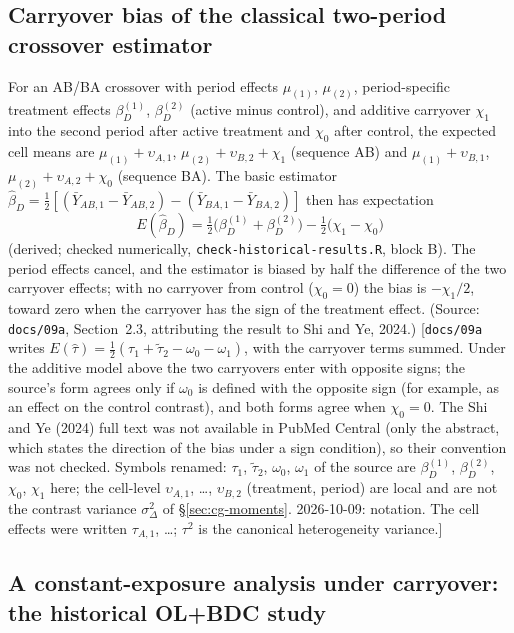 \documentclass[11pt]{article}
\newcommand{\note}[1]{\textcolor{blue!60!black}{\small [#1]}}
\newcommand{\code}[1]{\texttt{#1}}
\begin{document}
\subsection{Carryover bias of the classical two-period crossover
estimator}
\label{sec:inva-crossover}

For an AB/BA crossover with period effects $\mu_{(1)}$, $\mu_{(2)}$,
period-specific treatment effects $\beta_D^{(1)}$, $\beta_D^{(2)}$
(active minus control), and additive carryover $\chi_1$ into the second
period after active treatment and $\chi_0$ after control, the expected
cell means are
$\mu_{(1)} + \upsilon_{A,1}$, $\mu_{(2)} + \upsilon_{B,2} + \chi_1$ (sequence AB)
and $\mu_{(1)} + \upsilon_{B,1}$, $\mu_{(2)} + \upsilon_{A,2} + \chi_0$
(sequence BA). The basic estimator
$\hat\beta_D = \tfrac12[(\bar Y_{AB,1} - \bar Y_{AB,2}) -
(\bar Y_{BA,1} - \bar Y_{BA,2})]$ then has expectation
\begin{equation}
E(\hat\beta_D) = \tfrac12\big(\beta_D^{(1)} + \beta_D^{(2)}\big)
  - \tfrac12\big(\chi_1 - \chi_0\big)
\label{eq:inva-crossover}
\end{equation}
(derived; checked numerically, \code{check-historical-results.R}, block B). The
period effects cancel, and the estimator is biased by half the
difference of the two carryover effects; with no carryover from control
($\chi_0 = 0$) the bias is $-\chi_1/2$, toward zero when the carryover
has the sign of the treatment effect. (Source: \code{docs/09a},
Section~2.3, attributing the result to Shi and Ye, 2024.)
\note{\code{docs/09a} writes $E(\hat\tau) = \tfrac12(\tau_1 +
\tilde\tau_2 - \omega_0 - \omega_1)$, with the carryover terms summed.
Under the additive model above the two carryovers enter with opposite
signs; the source's form agrees only if $\omega_0$ is defined with the
opposite sign (for example, as an effect on the control contrast), and
both forms agree when $\chi_0 = 0$. The Shi and Ye (2024) full text was
not available in PubMed Central (only the abstract, which states the
direction of the bias under a sign condition), so their convention was
not checked. Symbols renamed: $\tau_1$, $\tilde\tau_2$, $\omega_0$,
$\omega_1$ of the source are $\beta_D^{(1)}$, $\beta_D^{(2)}$, $\chi_0$,
$\chi_1$ here; the cell-level $\upsilon_{A,1}$, \dots, $\upsilon_{B,2}$ (treatment, period) are local
and are not the contrast variance $\sigma_\Delta^2$ of \S\ref{sec:cg-moments}.
2026-10-09: notation. The cell effects were written $\tau_{A,1}$,
\dots; $\tau^2$ is the canonical heterogeneity variance.}

\subsection{A constant-exposure analysis under carryover: the
historical OL+BDC study}
\label{sec:inva-09a}
\end{document}
